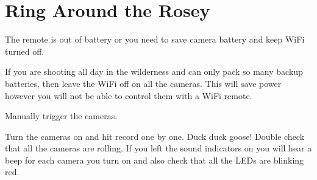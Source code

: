 \section{Ring Around the Rosey}
\pagecolor{white}
\label{chap:21}
\begin{fullwidth}

\problem

{\large The remote is out of battery or you need to save camera battery and keep WiFi turned off. \par}

If you are shooting all day in the wilderness and can only pack so many backup batteries, then leave the WiFi off on all the cameras. This will save power however you will not be able to control them with a WiFi remote. 


\solution

{\large Manually trigger the cameras. \par}

Turn the cameras on and hit record one by one. Duck duck goose! Double check that all the cameras are rolling. If you left the sound indicators on you will hear a beep for each camera you turn on and also check that all the LEDs are blinking red. 


\clearpage
\end{fullwidth}
